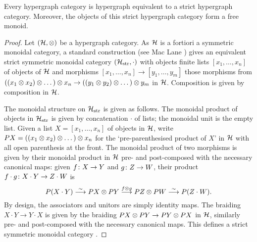 \begin{theorem} \label{thm.stricthypergraphs}
  Every hypergraph category is hypergraph equivalent to a strict hypergraph
  category. Moreover, the objects of this strict hypergraph category form a free
  monoid.
\end{theorem}
\begin{proof}
  Let $(\mathcal H,\otimes)$ be a hypergraph category. As $\mathcal H$ is a fortiori a
  symmetric monoidal category, a standard construction (see Mac Lane
  \cite[Theorem XI.3.1]{Mac98}) gives an equivalent strict symmetric monoidal
  category $(\mathcal H_{\mathrm{str}}, \cdot)$ with objects finite lists
  $[x_1,\dots,x_n]$ of objects of $\mathcal H$ and morphisms $[x_1,\dots,x_n] \to
  [y_1,\dots,y_m]$ those morphisms from $((x_1 \otimes x_2) \otimes \dots) \otimes x_n \to
  ((y_1 \otimes y_2) \otimes \dots) \otimes y_m$ in $\mathcal H$.  Composition is given by
  composition in $\mathcal H$.

  The monoidal structure on $\mathcal H_{\mathrm{str}}$ is given as follows. The
  monoidal product of objects in $\mathcal H_{\mathrm{str}}$ is given by
  concatenation $\cdot$ of lists; the monoidal unit is the empty list. Given a
  list $X = [x_1,\dots, x_n]$ of objects in $\mathcal H$, write $PX = ((x_1 \otimes x_2)
  \otimes \dots) \otimes x_n$ for the `pre-parenthesised product of $X$' in $\mathcal H$ with
  all open parenthesis at the front.  The monoidal product of two morphisms is
  given by their monoidal product in $\mathcal H$ pre- and post-composed with the
  necessary canonical maps: given $f{\colon} X \to Y$ and $g{\colon} Z \to W$, their
  product $f\cdot g{\colon} X\cdot Y \to Z \cdot W$ is 
  \[ 
    P(X \cdot Y) \stackrel{\sim}\longrightarrow PX \otimes PY \stackrel{f \otimes g}{\longrightarrow}
    PZ \otimes PW \stackrel{\sim}\longrightarrow P(Z \cdot W).  
  \] 
  By design, the associators and unitors are simply identity maps. The braiding
  $X \cdot Y \to Y \cdot X$ is given by the braiding $PX \otimes PY \to PY \otimes PX$
  in $\mathcal H$, similarly pre- and post-composed with the necessary canonical
  maps. This defines a strict symmetric monoidal category \cite{Mac98}.


\end{proof}
